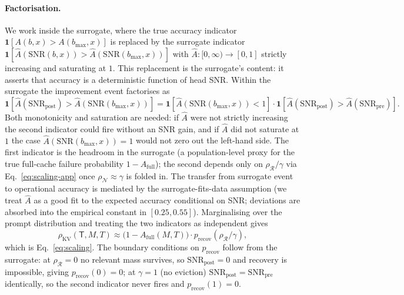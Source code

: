 \documentclass{article}
\begin{document}
\paragraph{Factorisation.} We work inside the surrogate, where the
true accuracy indicator $\mathbf{1}[A(b, x) > A(b_{\max}, x)]$ is replaced
by the surrogate indicator
$\mathbf{1}[\hat A(\mathrm{SNR}(b, x)) > \hat A(\mathrm{SNR}(b_{\max}, x))]$
with $\hat A: [0, \infty) \to [0, 1]$ strictly increasing and saturating at
$1$. This replacement is the surrogate's content: it asserts that accuracy
is a deterministic function of head SNR. Within the surrogate the
improvement event factorises as
\[
\mathbf{1}[\hat A(\mathrm{SNR}_{\mathrm{post}}) > \hat A(\mathrm{SNR}(b_{\max}, x))]
= \mathbf{1}[\hat A(\mathrm{SNR}(b_{\max}, x)) < 1] \cdot
\mathbf{1}[\hat A(\mathrm{SNR}_{\mathrm{post}}) > \hat A(\mathrm{SNR}_{\mathrm{pre}})].
\]
Both monotonicity and saturation are needed: if $\hat A$ were not strictly
increasing the second indicator could fire without an SNR gain, and if
$\hat A$ did not saturate at $1$ the case $\hat A(\mathrm{SNR}(b_{\max}, x)) = 1$
would not zero out the left-hand side. The first indicator is the headroom
in the surrogate (a population-level proxy for the true full-cache failure
probability $1 - A_{\mathrm{full}}$); the second depends only on
$\rho_{\mathcal{R}}/\gamma$ via Eq.~\eqref{eq:scaling-app} once
$\rho_{\mathcal{N}} \approx \gamma$ is folded in. The transfer from
surrogate event to operational accuracy is mediated by the
surrogate-fits-data assumption (we treat $\hat A$ as a good fit to the
expected accuracy conditional on SNR; deviations are absorbed into the
empirical constant in $[0.25, 0.55]$). Marginalising over the prompt
distribution and treating the two indicators as independent gives
\[
\rho_{\mathrm{KV}}(\mathsf{T}, M, T) \approx
\bigl(1 - A_{\mathrm{full}}(M, T)\bigr) \cdot
p_{\mathrm{recov}}(\rho_{\mathcal{R}} / \gamma),
\]
which is Eq.~\eqref{eq:scaling}. The boundary conditions on $p_{\mathrm{recov}}$
follow from the surrogate: at $\rho_{\mathcal{R}} = 0$ no relevant mass
survives, so $\mathrm{SNR}_{\mathrm{post}} = 0$ and recovery is impossible,
giving $p_{\mathrm{recov}}(0) = 0$; at $\gamma = 1$ (no eviction)
$\mathrm{SNR}_{\mathrm{post}} = \mathrm{SNR}_{\mathrm{pre}}$ identically, so
the second indicator never fires and $p_{\mathrm{recov}}(1) = 0$.
\end{document}
